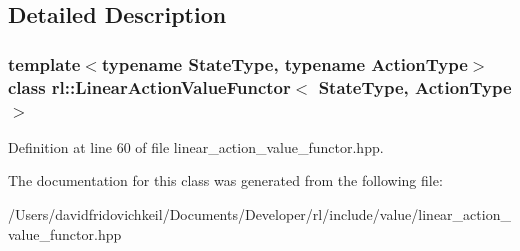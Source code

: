 \subsection{Detailed Description}
\subsubsection*{template$<$typename State\+Type, typename Action\+Type$>$\newline
class rl\+::\+Linear\+Action\+Value\+Functor$<$ State\+Type, Action\+Type $>$}



Definition at line 60 of file linear\+\_\+action\+\_\+value\+\_\+functor.\+hpp.



The documentation for this class was generated from the following file\+:\begin{DoxyCompactItemize}
\item 
/\+Users/davidfridovichkeil/\+Documents/\+Developer/rl/include/value/linear\+\_\+action\+\_\+value\+\_\+functor.\+hpp\end{DoxyCompactItemize}

